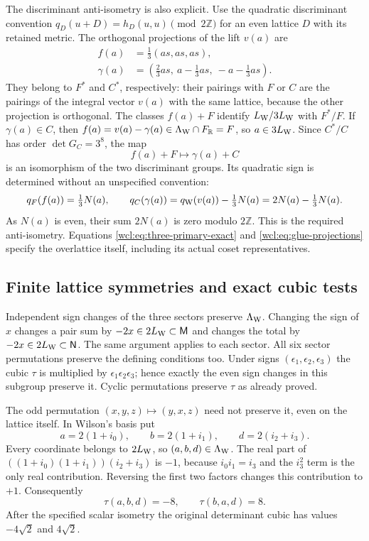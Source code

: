 The discriminant anti-isometry is also explicit. Use the quadratic
discriminant convention $q_D(u+D)=h_D(u,u)\pmod{2\mathbb Z}$
for an even lattice $D$ with its retained metric. The orthogonal
projections of the lift $v(a)$ are
\begin{align}
 f(a)&=\tfrac13(as,as,as),\nonumber\\
 \gamma(a)&=\left(\tfrac23as,\ a-\tfrac13as,\ -a-\tfrac13as\right).
 \label{wcl:eq:glue-projections}
\end{align}
They belong to $F^*$ and $C^*$, respectively: their pairings with
$F$ or $C$ are the pairings of the integral vector $v(a)$ with the
same lattice, because the other projection is orthogonal.
The classes $f(a)+F$ identify $L_{\rm W}/3L_{\rm W}$ with $F^*/F$.
If $\gamma(a)\in C$, then $f(a)=v(a)-\gamma(a)\in
\Lambda_{\rm W}\cap F_{\mathbb R}=F$, so $a\in3L_{\rm W}$.
Since $C^*/C$ has order $\det G_C=3^8$, the map
\[
 f(a)+F\longmapsto\gamma(a)+C
\]
is an isomorphism of the two discriminant groups. Its quadratic
sign is determined without an unspecified convention:
\[
 q_F(f(a))=\tfrac13N(a),\qquad
 q_C(\gamma(a))=q_{\rm W}(v(a))-\tfrac13N(a)
              =2N(a)-\tfrac13N(a).
\]
As $N(a)$ is even, their sum $2N(a)$ is zero modulo $2\mathbb Z$.
This is the required anti-isometry. Equations
\eqref{wcl:eq:three-primary-exact} and
\eqref{wcl:eq:glue-projections} specify the overlattice itself,
including its actual coset representatives.

\subsection{Finite lattice symmetries and exact cubic tests}

Independent sign changes of the three sectors preserve
$\Lambda_{\rm W}$. Changing the sign of $x$ changes a pair sum by
$-2x\in2L_{\rm W}\subset\mathsf M$ and changes the total by
$-2x\in2L_{\rm W}\subset\mathsf N$. The same argument applies to
each sector. All six sector permutations preserve the defining
conditions too. Under signs $(\epsilon_1,\epsilon_2,\epsilon_3)$
the cubic $\tau$ is multiplied by $\epsilon_1\epsilon_2\epsilon_3$;
hence exactly the even sign changes in this subgroup preserve it.
Cyclic permutations preserve $\tau$ as already proved.

The odd permutation $(x,y,z)\mapsto(y,x,z)$ need not preserve it,
even on the lattice itself. In Wilson's basis put
\[
 a=2(1+i_0),\qquad b=2(1+i_1),\qquad d=2(i_2+i_3).
\]
Every coordinate belongs to $2L_{\rm W}$, so $(a,b,d)\in
\Lambda_{\rm W}$. The real part of
$((1+i_0)(1+i_1))(i_2+i_3)$ is $-1$, because
$i_0i_1=i_3$ and the $i_3^2$ term is the only real contribution.
Reversing the first two factors changes this contribution to $+1$.
Consequently
\begin{equation}
 \tau(a,b,d)=-8,\qquad \tau(b,a,d)=8.
 \label{wcl:eq:transposition-cubic}
\end{equation}
After the specified scalar isometry the original determinant cubic
has values $-4\sqrt2$ and $4\sqrt2$.

